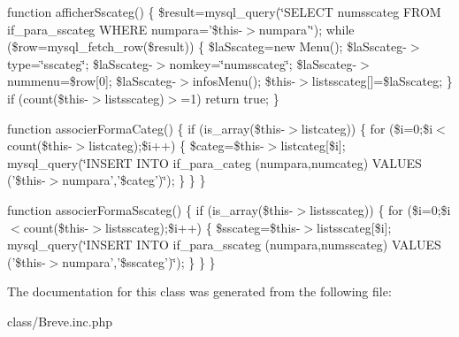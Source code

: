 function afficherSscateg() \{ \$result=mysql\_\-query(\char`\"{}SELECT numsscateg FROM if\_\-para\_\-sscateg WHERE numpara='\$this-\/$>$numpara'\char`\"{}); while (\$row=mysql\_\-fetch\_\-row(\$result)) \{ \$laSscateg=new Menu(); \$laSscateg-\/$>$type=\char`\"{}sscateg\char`\"{}; \$laSscateg-\/$>$nomkey=\char`\"{}numsscateg\char`\"{}; \$laSscateg-\/$>$nummenu=\$row\mbox{[}0\mbox{]}; \$laSscateg-\/$>$infosMenu(); \$this-\/$>$listsscateg\mbox{[}\mbox{]}=\$laSscateg; \} if (count(\$this-\/$>$listsscateg)$>$=1) return true; \}

function associerFormaCateg() \{ if (is\_\-array(\$this-\/$>$listcateg)) \{ for (\$i=0;\$i$<$count(\$this-\/$>$listcateg);\$i++) \{ \$categ=\$this-\/$>$listcateg\mbox{[}\$i\mbox{]}; mysql\_\-query(\char`\"{}INSERT INTO if\_\-para\_\-categ (numpara,numcateg) VALUES ('\$this-\/$>$numpara','\$categ')\char`\"{}); \} \} \}

function associerFormaSscateg() \{ if (is\_\-array(\$this-\/$>$listsscateg)) \{ for (\$i=0;\$i$<$count(\$this-\/$>$listsscateg);\$i++) \{ \$sscateg=\$this-\/$>$listsscateg\mbox{[}\$i\mbox{]}; mysql\_\-query(\char`\"{}INSERT INTO if\_\-para\_\-sscateg (numpara,numsscateg) VALUES ('\$this-\/$>$numpara','\$sscateg')\char`\"{}); \} \} \} 

The documentation for this class was generated from the following file:\begin{DoxyCompactItemize}
\item 
class/Breve.inc.php\end{DoxyCompactItemize}
